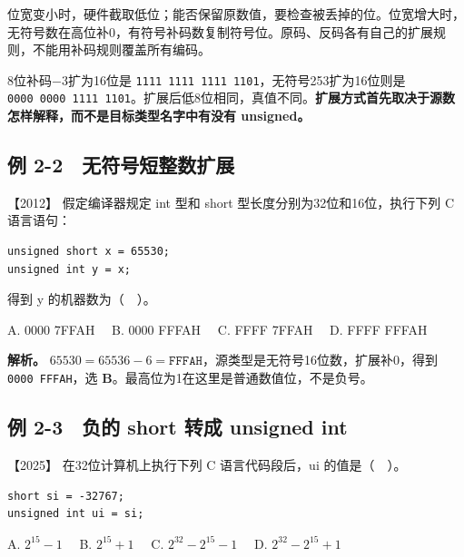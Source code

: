 位宽变小时，硬件截取低位；能否保留原数值，要检查被丢掉的位。位宽增大时，无符号数在高位补0，有符号补码数复制符号位。原码、反码各有自己的扩展规则，不能用补码规则覆盖所有编码。

8位补码−3扩为16位是 \allowbreak{}\texttt{1111\ 1111\ 1111\ 1101}，无符号253扩为16位则是 \allowbreak{}\texttt{0000\ 0000\ 1111\ 1101}。扩展后低8位相同，真值不同。\textbf{扩展方式首先取决于源数怎样解释，而不是目标类型名字中有没有 unsigned。}

\subsection{例 2-2　无符号短整数扩展}\label{co-ex2-2}

\noindent{}【2012】 假定编译器规定 int 型和 short 型长度分别为32位和16位，执行下列 C 语言语句：

\par\medskip\noindent
\begin{minipage}{\linewidth}
\begin{verbatim}
unsigned short x = 65530;
unsigned int y = x;
\end{verbatim}
\end{minipage}\par\medskip

得到 y 的机器数为（　）。

A. 0000 7FFAH　 B. 0000 FFFAH　 C. FFFF 7FFAH　 D. FFFF FFFAH


\textbf{解析。} \(65530=65536-6=\mathtt{FFFAH}\)，源类型是无符号16位数，扩展补0，得到 \allowbreak{}\texttt{0000\ FFFAH}，选 \textbf{B}。最高位为1在这里是普通数值位，不是负号。

\subsection{例 2-3　负的 short 转成 unsigned int}\label{co-ex2-3}

\noindent{}【2025】 在32位计算机上执行下列 C 语言代码段后，ui 的值是（　）。

\par\medskip\noindent
\begin{minipage}{\linewidth}
\begin{verbatim}
short si = -32767;
unsigned int ui = si;
\end{verbatim}
\end{minipage}\par\medskip

A. \(2^{15}-1\)　 B. \(2^{15}+1\)　 C. \(2^{32}-2^{15}-1\)　 D. \(2^{32}-2^{15}+1\)

